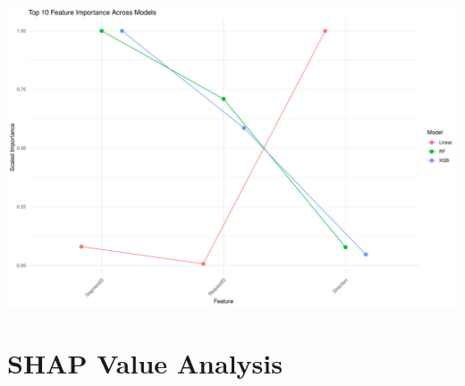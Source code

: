 \documentclass[
  letterpaper,
  DIV=11,
  numbers=noendperiod]{scrreprt}
\begin{document}
\includegraphics[width=1\textwidth,height=\textheight]{figures/feature-importance-1.pdf}

\section{SHAP Value Analysis}\label{shap-value-analysis}
\end{document}
